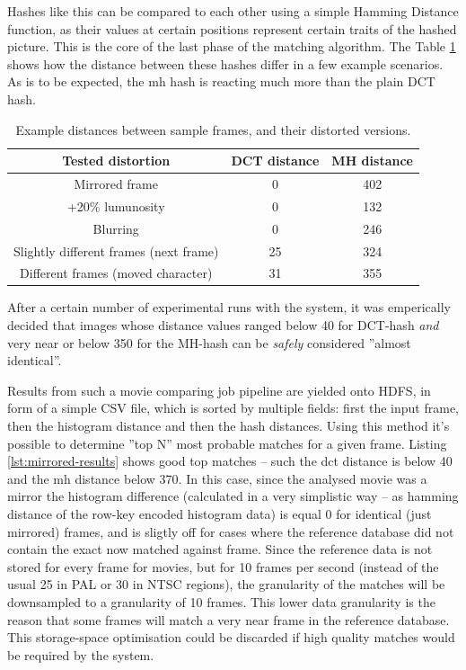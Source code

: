 Hashes like this can be compared to each other using a simple Hamming Distance \cite{hamming-distance} function, as their values at certain positions represent certain traits of the hashed picture. This is the core of the last phase of the matching algorithm. The Table \ref{tab:hash-distances} shows how the distance between these hashes differ in a few example scenarios. As is to be expected, the mh hash is reacting much more than the plain DCT hash. 

\begin{table}[ch!]
  \centering
  \begin{tabular}{|c|c|c|}
    \hline 
    \textbf{Tested distortion}             & \textbf{DCT distance} & \textbf{MH distance} \\ \hline
    Mirrored frame                         & 0                     &  402 \\ \hline
    +20\% lumunosity                       & 0                     &  132 \\ \hline
    Blurring                               & 0                     &  246 \\ \hline
    Slightly different frames (next frame) & 25                    &  324 \\ \hline
    Different frames (moved character)     & 31                    &  355 \\ \hline
    
  \end{tabular}
  \caption{Example distances between sample frames, and their distorted versions.}
  \label{tab:hash-distances}
\end{table}

After a certain number of experimental runs with the system, it was emperically decided that images whose distance values ranged below 40 for DCT-hash \textit{and} very near or below 350 for the MH-hash can be \textit{safely} considered ''almost identical''.

Results from such a movie comparing job pipeline are yielded onto HDFS, in form of a simple CSV file, which is sorted by multiple fields: first the input frame, then the histogram distance and then the hash distances. Using this method it's possible to determine ''top N'' most probable matches for a given frame. Listing \ref{lst:mirrored-results} shows good top matches -- such the dct distance is below 40 and the mh distance below 370. In this case, since the analysed movie was a mirror the histogram difference (calculated in a very simplistic way -- as hamming distance of the row-key encoded histogram data) is equal 0 for identical (just mirrored) frames, and is sligtly off for cases where the reference database did not contain the exact now matched against frame. Since the reference data is not stored for every frame for movies, but for 10 frames per second (instead of the usual 25 in PAL or 30 in NTSC regions), the granularity of the matches will be downsampled to a granularity of 10 frames. This lower data granularity is the reason that some frames will match a very near frame in the reference database. This storage-space optimisation could be discarded if high quality matches would be required by the system.

